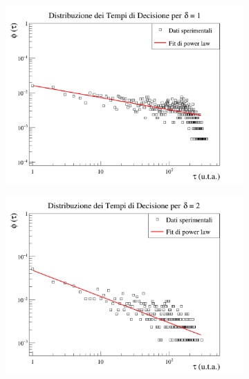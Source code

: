 \documentclass[letterpaper,10pt]{article}
\begin{document}
\begin{figure}[h]
\centering
\begin{subfigure}{0.8\textwidth}
\includegraphics[width=\linewidth]{time_graph_d1.png}
\end{subfigure}
\begin{subfigure}{0.8\textwidth}
\includegraphics[width=\linewidth]{time_graph_d2.png}
\end{subfigure}
\end{figure}
\end{document}
